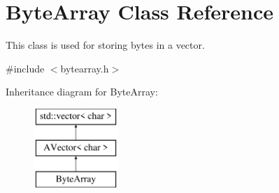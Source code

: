 \hypertarget{class_byte_array}{}\section{Byte\+Array Class Reference}
\label{class_byte_array}


This class is used for storing bytes in a vector.  




{\ttfamily \#include $<$bytearray.\+h$>$}

Inheritance diagram for Byte\+Array\+:\begin{figure}[H]
\begin{center}
\leavevmode
\includegraphics[height=3.000000cm]{class_byte_array}
\end{center}
\end{figure}
